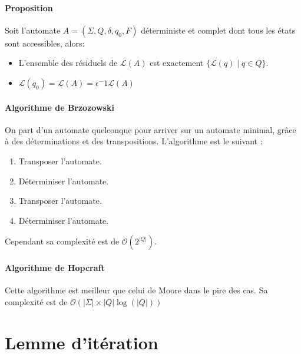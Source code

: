 \paragraph{Proposition} %
\label{par:proposition}

Soit l'automate $A=(\Sigma,Q,\delta,q_0,F)$ déterministe et complet dont tous les états sont accessibles, alors:
\begin{itemize}
	\item L'ensemble des résiduels de $\mathcal{L}(A)$ est exactement $\{\mathcal{L}(q) \mid q \in Q\}$.
	\item $\mathcal{L}(q_0) = \mathcal{L}(A) = \epsilon^-1 \mathcal{L}(A)$
\end{itemize}



\paragraph{Algorithme de Brzozowski} %
\label{par:algorithme_de_brzozowski}

On part d'un automate quelconque pour arriver sur un automate minimal, grâce à des déterminations et des transpositions. L'algorithme est le suivant :
\begin{enumerate}
	\item Transposer l'automate.
	\item Déterminiser l'automate.
	\item Transposer l'automate.
	\item Déterminiser l'automate.
\end{enumerate}
Cependant sa complexité est de $\mathcal{O}(2^{\left|Q\right|})$.



\paragraph{Algorithme de Hopcraft} %
\label{par:algorithme_de_hopcraft}

Cette algorithme est meilleur que celui de Moore dans le pire des cas. Sa complexité est de $\mathcal{O}(\left|\Sigma\right| \times	\left|Q\right| \log (\left|Q\right|))$





\section{Lemme d'itération} %
\label{sec:lemme_d_it_ration}


